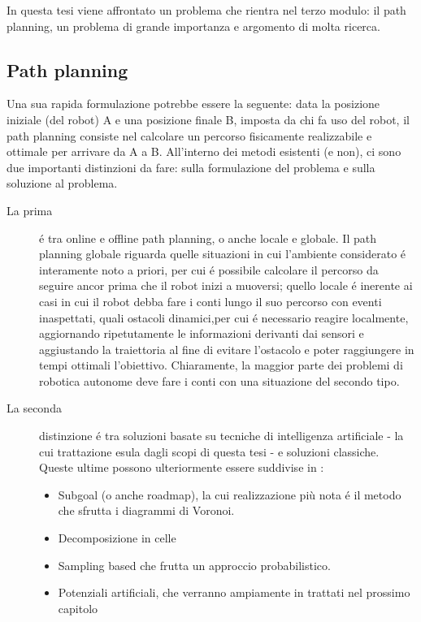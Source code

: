 \documentclass[14pt,a4paper]{extarticle}
\begin{document}
In questa tesi viene affrontato un problema che rientra nel terzo modulo: il path planning, un problema di grande importanza e argomento di molta ricerca.

\subsection{Path planning}

Una sua rapida formulazione potrebbe essere la seguente: data la posizione iniziale (del robot) A e una posizione finale B, imposta da chi fa uso del robot, il path planning consiste nel calcolare un percorso fisicamente realizzabile e ottimale per arrivare da A a B.
All'interno dei metodi esistenti (e non), ci sono due importanti distinzioni da fare: sulla formulazione del problema e sulla soluzione al problema.
\begin{description}
\item[La prima] é tra online e offline path planning, o anche locale e globale. Il path planning globale riguarda quelle situazioni in cui l'ambiente considerato é interamente noto a priori, per cui é possibile calcolare il percorso da seguire ancor prima che il robot inizi a muoversi; quello locale é inerente ai casi in cui il robot debba fare i conti lungo il suo percorso con eventi inaspettati, quali ostacoli dinamici,per cui é necessario reagire localmente, aggiornando ripetutamente le informazioni derivanti dai sensori e aggiustando la traiettoria al fine di evitare l'ostacolo e poter raggiungere in tempi ottimali l'obiettivo. Chiaramente, la maggior parte dei problemi di robotica autonome deve fare i conti con una situazione del secondo tipo. 
\item[La seconda] distinzione é tra soluzioni basate su tecniche di intelligenza artificiale - la cui trattazione esula dagli scopi di questa tesi - e soluzioni classiche. Queste ultime possono ulteriormente essere suddivise in \cite{siciliano}:
\begin{itemize}
\item Subgoal (o anche roadmap), la cui realizzazione più nota é il metodo che sfrutta i diagrammi di Voronoi. 
\item Decomposizione in celle
\item Sampling based che frutta un approccio probabilistico.
\item Potenziali artificiali, che verranno ampiamente in trattati nel prossimo capitolo
\end{itemize}
\end{description}
\end{document}
